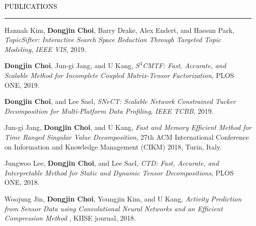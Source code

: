 \documentclass{resume} %
\renewenvironment{rSection}[1]{
	\sectionskip
	\textcolor{Black}{\MakeUppercase{#1}}
	\sectionlineskip
	\hrule
	\begin{list}{}{
			\setlength{\leftmargin}{1.5em}
		}
		\item[]
	}{
	\end{list}
}
\begin{document}
\begin{rSection}{Publications}
	\begin{rSubsection}{}{}{}{}
		\vspace*{-2.5mm}
		
		\item Hannah Kim, \textbf{Dongjin Choi}, Barry Drake, Alex Endert, and Haesun Park, \textit{TopicSifter: Interactive Search Space Reduction Through Targeted Topic Modeling}, \textit{IEEE VIS}, 2019.
		
		\item \textbf{Dongjin Choi}, Jun-gi Jang, and U Kang, \textit{$S^3$CMTF: Fast, Accurate, and Scalable Method for Incomplete Coupled Matrix-Tensor Factorization}, PLOS ONE, 2019.
		
		\item \textbf{Dongjin Choi}, and Lee Sael, \textit{SNeCT: Scalable Network Constrained Tucker Decomposition for Multi-Platform Data Profiling}, \textit{IEEE TCBB}, 2019.
		
		\item Jun-gi Jang, \textbf{Dongjin Choi}, and U Kang, \textit{Fast and Memory Efficient Method for Time Ranged Singular Value Decomposition}, 27th ACM International Conference on Information and Knowledge Management (CIKM) 2018, Turin, Italy.
		
		\item Jungwoo Lee, \textbf{Dongjin Choi}, and Lee Sael, \textit{CTD: Fast, Accurate, and Interpretable Method for Static and Dynamic Tensor Decompositions}, PLOS ONE, 2018.
		
		\item Woojung Jin, \textbf{Dongjin Choi}, Youngjin Kim, and U Kang, \textit{Activity Prediction from Sensor Data using Convolutional Neural Networks and an Efficient Compression Method }, KIISE journal, 2018.
		
	\end{rSubsection}
	
\end{rSection}
\vspace{-3mm}

\end{document}
